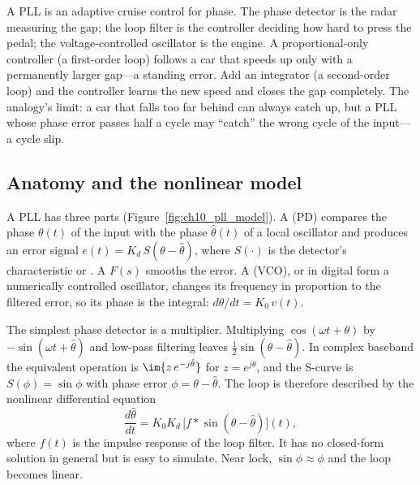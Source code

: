 \begin{analogy}
A PLL is an adaptive cruise control for phase. The phase detector is the radar measuring the
gap; the loop filter is the controller deciding how hard to press the pedal; the
voltage-controlled oscillator is the engine. A proportional-only controller (a first-order loop)
follows a car that speeds up only with a permanently larger gap---a standing error. Add an
integrator (a second-order loop) and the controller learns the new speed and closes the gap
completely. The analogy's limit: a car that falls too far behind can always catch up, but a PLL
whose phase error passes half a cycle may ``catch'' the wrong cycle of the input---a cycle slip.
\end{analogy}

\subsection{Anatomy and the nonlinear model}

A PLL has three parts (Figure~\ref{fig:ch10_pll_model}). A  (PD) compares the
phase $\theta(t)$ of the input with the phase $\hat\theta(t)$ of a local oscillator and produces an
error signal $e(t)=K_d\,S(\theta-\hat\theta)$, where $S(\cdot)$ is the detector's characteristic or
. A  $F(s)$ smooths the error. A  (VCO), or in digital form a numerically controlled oscillator, changes its frequency in
proportion to the filtered error, so its phase is the integral: $d\hat\theta/dt=K_0\,v(t)$.

The simplest phase detector is a multiplier. Multiplying $\cos(\omega t+\theta)$ by
$-\sin(\omega t+\hat\theta)$ and low-pass filtering leaves $\tfrac12\sin(\theta-\hat\theta)$. In
complex baseband the equivalent operation is $\im\{z\,e^{-j\hat\theta}\}$ for $z=e^{j\theta}$, and the
S-curve is $S(\phi)=\sin\phi$ with phase error $\phi=\theta-\hat\theta$. The loop is therefore
described by the nonlinear differential equation
\begin{equation}
\frac{d\hat\theta}{dt}=K_0K_d\,\bigl[f*\sin(\theta-\hat\theta)\bigr](t),
\end{equation}
where $f(t)$ is the impulse response of the loop filter. It has no closed-form solution in general but
is easy to simulate. Near lock, $\sin\phi\approx\phi$ and the loop becomes linear.

